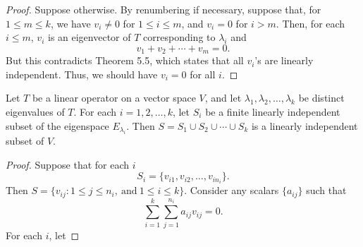\begin{proof}
Suppose otherwise. By renumbering if necessary, suppose that, for \( 1 \leq m \leq k  \), we have \( {v}_{i} \neq 0  \) for \( 1 \leq i \leq m \), and \( {v}_{i} = 0  \) for \( i > m  \). Then, for each \( i \leq m  \), \( {v}_{i} \) is an eigenvector of \( T \) corresponding to \( {\lambda}_{i} \) and  
\[ {v}_{1} + {v}_{2} + \cdots + {v}_{m} = 0. \]
But this contradicts Theorem 5.5, which states that all \( {v}_{i} \)'s are linearly independent. Thus, we should have \( {v}_{i} = 0  \) for all \( i \).
\end{proof}

\begin{theorem}
   Let \( T \) be a linear operator on a vector space \( V  \), and let \( {\lambda}_{1}, {\lambda}_{2}, \dots, {\lambda}_{k } \) be distinct eigenvalues of \( T  \). For each \( i = 1,2, \dots, k  \), let \( {S}_{i} \) be a finite linearly independent subset of the eigenspace \( {E}_{{\lambda}_{i}}  \). Then \( S = {S}_{1} \cup {S}_{2} \cup \cdots \cup {S}_{k} \) is a linearly independent subset of \( V  \). 
\end{theorem}
\begin{proof}
Suppose that for each \( i  \) 
\[  {S}_{i} = \{ {v}_{i1}, {v}_{i2}, \dots, {v}_{i {n}_{i}} \}. \]
Then \( S = \{ {v}_{ij} : 1 \leq j \leq {n}_{i}, \ \text{and} \ 1 \leq i \leq k  \}. \) Consider any scalars \( \{ {a}_{ij} \}  \) such that 
\[  \sum_{ i=1 }^{ k  } \sum_{ j=1 }^{ {n}_{i} } {a}_{ij } {v}_{ij} = 0.  \]
For each \( i  \), let 
\end{proof}
